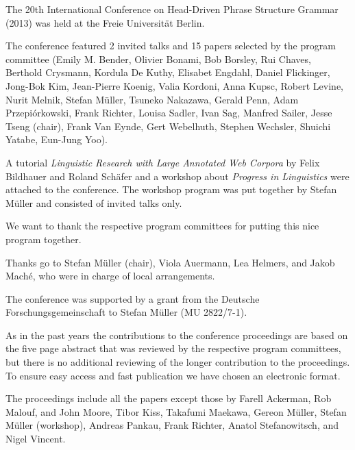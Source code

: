 The 20th International Conference on Head-Driven Phrase Structure Grammar (2013) was held at the
Freie Universität Berlin.

The conference featured 2 invited talks and 15 papers selected by the program committee 
(Emily M. Bender,
    Olivier Bonami,
    Bob Borsley,
    Rui Chaves,
    Berthold Crysmann,
    Kordula De Kuthy,
    Elisabet Engdahl,
    Daniel Flickinger,
    Jong-Bok Kim,
    Jean-Pierre Koenig,
    Valia Kordoni,
    Anna Kupsc,
    Robert Levine,
    Nurit Melnik,
    Stefan Müller,
    Tsuneko Nakazawa,
    Gerald Penn,
    Adam Przepiórkowski,
    Frank Richter,
    Louisa Sadler,
    Ivan Sag,
    Manfred Sailer,
    Jesse Tseng (chair),
    Frank Van Eynde,
    Gert Webelhuth,
    Stephen Wechsler,
    Shuichi Yatabe,
    Eun-Jung Yoo).

A tutorial \emph{Linguistic Research with Large Annotated Web Corpora} by Felix Bild\-hauer
and Roland Schäfer and a workshop about \emph{Progress in Linguistics}
were attached to the conference. The workshop program was put together by Stefan Müller and consisted of
invited talks only.

We want to thank the respective program committees for putting this nice program together.

Thanks go to Stefan Müller (chair), Viola Auermann, Lea Helmers, and Jakob Maché, who were
in charge of local arrangements.
 
The conference was supported by a grant from the Deutsche Forschungsgemeinschaft to Stefan Müller (MU 2822/7-1).

As in the past years the contributions to the conference proceedings are based on the five page abstract
that was reviewed by the respective program committees, but there is no additional reviewing of the
longer contribution to the proceedings.
To ensure easy access and fast publication we have chosen an electronic format.

The proceedings include all the papers except those by  Farell Ackerman, Rob Malouf, and John Moore,
Tibor Kiss, Takafumi Maekawa, Gereon Müller, Stefan Müller (workshop), Andreas Pankau, Frank
Richter, Anatol Stefanowitsch, and Nigel Vincent.

